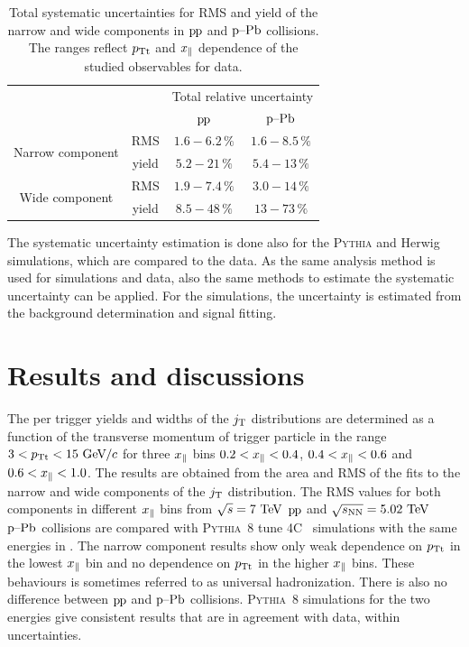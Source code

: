 \begin{table}
  \caption{Total systematic uncertainties for RMS and yield of the narrow and wide components in $\mbox{p\kern-0.05em p}$ and $\mbox{p--Pb}$ collisions. The ranges reflect $p_{\rm Tt}$ and $x_{\parallel}$ dependence of the studied observables for data.}
  \begin{center}
    \begin{tabular}{cccc}
      \toprule
                                             &       &\multicolumn{2}{c}{Total relative uncertainty} \\
                                             &       &      $\mbox{p\kern-0.05em p}$        &      $\mbox{p--Pb}$        \\
                                             \hline
        \multirow{ 2}{*}{Narrow component}   &  RMS  &  $1.6 - 6.2\,\%$  &   $1.6 - 8.5\,\%$  \\
                                             & yield &  $5.2 - 21\,\%$   &   $5.4 - 13\,\%$   \\
        \multirow{ 2}{*}{Wide component}     &  RMS  &  $1.9 - 7.4\,\%$  &   $3.0 - 14\,\%$   \\
                                             & yield &  $8.5 - 48\,\%$   &   $13  - 73\,\%$   \\
        \bottomrule
    \end{tabular}
  \end{center}
  \label{tab:uncertainties}
\end{table} 

The systematic uncertainty estimation is done also for the \textsc{Pythia} and Herwig simulations, which are compared to the data. As the same analysis method is used for simulations and data, also the same methods to estimate the systematic uncertainty can be applied. For the simulations, the uncertainty is estimated from the background determination and signal fitting.

\section{Results and discussions}
\label{sec:results}

The per trigger yields and widths of the $j_{\rm T}$ distributions are determined as a function of the transverse momentum of trigger particle in the range $3 < p_{\rm Tt} < 15~\mathrm{GeV}\kern-0.05em/\kern-0.02em c$ for three $x_{\parallel}$ bins $0.2 < x_{\parallel} < 0.4$, $0.4 < x_{\parallel} < 0.6$ and $0.6 < x_{\parallel} < 1.0$. The results are obtained from the area and RMS of the fits to the narrow and wide components of the $j_{\rm T}$ distribution. The RMS values for both components in different $x_{\parallel}$ bins from $\sqrt{s} = 7~\mathrm{TeV}$ $\mbox{p\kern-0.05em p}$ and $\sqrt{s_{\mathrm{NN}}} = 5.02~\mathrm{TeV}$ $\mbox{p--Pb}$ collisions are compared with \textsc{Pythia}~8 tune 4C~\cite{pythia4CTune} simulations with the same energies in . The narrow component results show only weak dependence on $p_{\rm Tt}$ in the lowest $x_{\parallel}$ bin and no dependence on $p_{\rm Tt}$ in the higher $x_{\parallel}$ bins. These behaviours is sometimes referred to as universal hadronization. There is also no difference between $\mbox{p\kern-0.05em p}$ and $\mbox{p--Pb}$ collisions. \textsc{Pythia}~8 simulations for the two energies give consistent results that are in agreement with data, within uncertainties.

